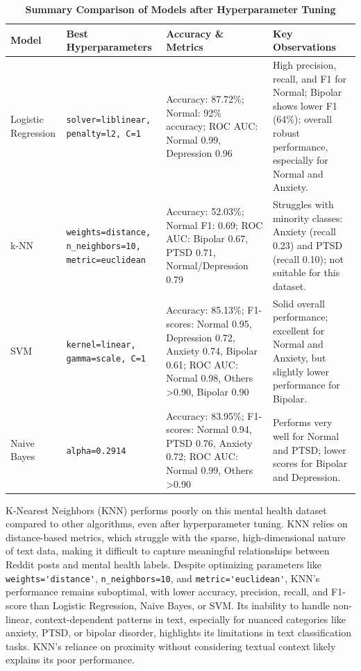 \pagebreak

\begin{table}[H]
    \centering
    \renewcommand{\arraystretch}{1.3}
    \small
    \begin{tabularx}{\textwidth}{|l|X|X|X|}
        \hline
        \textbf{Model} & \textbf{Best Hyperparameters} & \textbf{Accuracy \& Metrics} & \textbf{Key Observations} \\
        \hline
        Logistic Regression & \texttt{solver=liblinear, penalty=l2, C=1} & Accuracy: 87.72\%; Normal: 92\% accuracy; ROC AUC: Normal 0.99, Depression 0.96 & High precision, recall, and F1 for Normal; Bipolar shows lower F1 (64\%); overall robust performance, especially for Normal and Anxiety. \\
        \hline
        k-NN & \texttt{weights=distance, n\_neighbors=10, metric=euclidean} & Accuracy: 52.03\%; Normal F1: 0.69; ROC AUC: Bipolar 0.67, PTSD 0.71, Normal/Depression 0.79 & Struggles with minority classes: Anxiety (recall 0.23) and PTSD (recall 0.10); not suitable for this dataset. \\
        \hline
        SVM & \texttt{kernel=linear, gamma=scale, C=1} & Accuracy: 85.13\%; F1-scores: Normal 0.95, Depression 0.72, Anxiety 0.74, Bipolar 0.61; ROC AUC: Normal 0.98, Others >0.90, Bipolar 0.90 & Solid overall performance; excellent for Normal and Anxiety, but slightly lower performance for Bipolar. \\
        \hline
        Naive Bayes & \texttt{alpha=0.2914} & Accuracy: 83.95\%; F1-scores: Normal 0.94, PTSD 0.76, Anxiety 0.72; ROC AUC: Normal 0.99, Others >0.90 & Performs very well for Normal and PTSD; lower scores for Bipolar and Depression. \\
        \hline
    \end{tabularx}
    \caption*{\textbf{Summary Comparison of Models after Hyperparameter Tuning}}
    \label{tab:hp_tuning_summary}
\end{table}

\vspace{1em}

\noindent
K-Nearest Neighbors (KNN) performs poorly on this mental health dataset compared to other algorithms, even after hyperparameter tuning. KNN relies on distance-based metrics, which struggle with the sparse, high-dimensional nature of text data, making it difficult to capture meaningful relationships between Reddit posts and mental health labels. Despite optimizing parameters like \verb|weights='distance'|, \verb|n_neighbors=10|, and \verb|metric='euclidean'|, KNN's performance remains suboptimal, with lower accuracy, precision, recall, and F1-score than Logistic Regression, Naive Bayes, or SVM. Its inability to handle non-linear, context-dependent patterns in text, especially for nuanced categories like anxiety, PTSD, or bipolar disorder, highlights its limitations in text classification tasks. KNN's reliance on proximity without considering textual context likely explains its poor performance.

